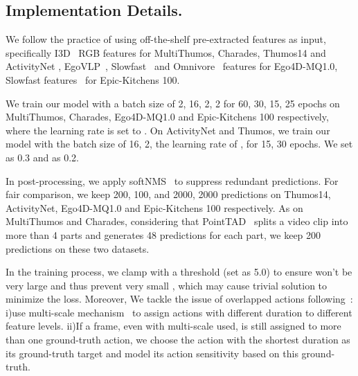 \documentclass[10pt,twocolumn,letterpaper]{article}
\begin{document}
\subsection{Implementation Details.} 
\par We follow the practice of using off-the-shelf pre-extracted features as input, specifically I3D~\cite{i3d} RGB features for MultiThumos, Charades, Thumos14 and ActivityNet , EgoVLP~\cite{kevin2022egovlp}, Slowfast~\cite{slowfast} and Omnivore~\cite{girdhar2022omnivore} features for Ego4D-MQ1.0, Slowfast features~\cite{slowfast,Damen2022RESCALING} for Epic-Kitchens 100.  
\par We train our model with a batch size of 2, 16, 2, 2 for 60, 30, 15, 25 epochs on MultiThumos, Charades, Ego4D-MQ1.0 and Epic-Kitchens 100 respectively, where the learning rate is set to . On ActivityNet and Thumos, we train our model with the batch size of 16, 2, the learning rate of ,   for 15, 30 epochs. We set  as 0.3 and  as 0.2. 
\par In post-processing, we apply softNMS~\cite{softnms} to suppress redundant predictions. For fair comparison, we keep 200, 100, and 2000, 2000 predictions on Thumos14, ActivityNet, Ego4D-MQ1.0 and Epic-Kitchens 100 respectively. As on MultiThumos and Charades, considering that PointTAD~\cite{tanpointtad} splits a video clip into more than 4 parts and generates 48 predictions for each part, we keep 200 predictions on these two datasets. 
\par In the training process, we clamp  with a threshold (set as 5.0) to ensure  won’t be very large and thus prevent very small , which may cause trivial solution to minimize the loss. Moreover, We tackle the issue of overlapped actions following~\cite{zhang2022actionformer,tian2019fcos}: i)use multi-scale mechanism~\cite{fpn} to assign actions with different
duration to different feature levels. ii)If a frame, even with multi-scale used, is still assigned to more than one ground-truth action, we choose the action with the shortest duration as its ground-truth target and model its action sensitivity based on this ground-truth.
\end{document}
